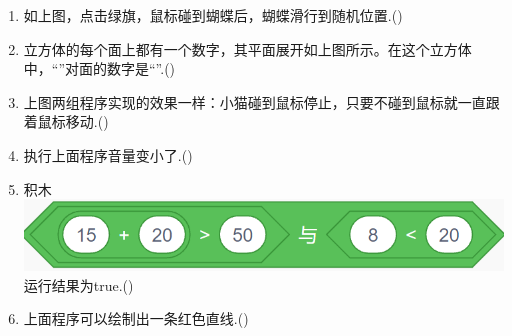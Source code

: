 \documentclass[10pt, a4paper]{article}
\begin{document}
\begin{enumerate}
        \item 如上图，点击绿旗，鼠标碰到蝴蝶后，蝴蝶滑行到随机位置.(\qquad)
        
        \item 立方体的每个面上都有一个数字，其平面展开如上图所示。在这个立方体中，“”对面的数字是“”.(\qquad)
        
        \item 上图两组程序实现的效果一样：小猫碰到鼠标停止，只要不碰到鼠标就一直跟着鼠标移动.(\qquad)
        
        \item 执行上面程序音量变小了.(\qquad)
        
        \item 积木\includegraphics[width=.3\textwidth]{34.png}运行结果为true.(\qquad)
        
        \item 上面程序可以绘制出一条红色直线.(\qquad)
    \end{enumerate}
\end{document}
